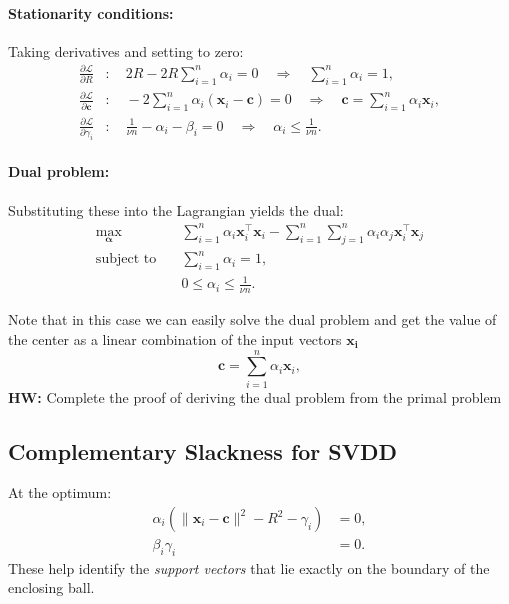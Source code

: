 \documentclass[11pt]{report}
\begin{document}
\paragraph{Stationarity conditions:}
Taking derivatives and setting to zero:
\begin{align}
\frac{\partial \mathcal{L}}{\partial R} & : \quad 2R - 2R \sum_{i=1}^n \alpha_i = 0 
\quad \Rightarrow \quad \sum_{i=1}^n \alpha_i = 1, \\
\frac{\partial \mathcal{L}}{\partial \mathbf{c}} & : \quad -2 \sum_{i=1}^n \alpha_i (\mathbf{x}_i - \mathbf{c}) = 0
\quad \Rightarrow \quad \mathbf{c} = \sum_{i=1}^n \alpha_i \mathbf{x}_i, \\
\frac{\partial \mathcal{L}}{\partial \gamma_i} & : \quad \frac{1}{\nu n} - \alpha_i - \beta_i = 0
\quad \Rightarrow \quad \alpha_i \leq \frac{1}{\nu n}.
\end{align}

\paragraph{Dual problem:}
Substituting these into the Lagrangian yields the dual:
\begin{align}
\max_{\boldsymbol{\alpha}} \quad & 
\sum_{i=1}^n \alpha_i \mathbf{x}_i^\top \mathbf{x}_i 
- \sum_{i=1}^n \sum_{j=1}^n \alpha_i \alpha_j \mathbf{x}_i^\top \mathbf{x}_j \\
\text{subject to} \quad & 
\sum_{i=1}^n \alpha_i = 1, \\
& 0 \leq \alpha_i \leq \frac{1}{\nu n}.
\end{align}

Note that in this case we can easily solve the dual problem and get the value of the center as a linear combination of the input vectors $\boldsymbol{x_i}$
\[\mathbf{c} = \sum_{i=1}^n \alpha_i \mathbf{x}_i,\]
\textbf{HW: }Complete the proof of deriving the dual problem from the primal problem

\subsection{Complementary Slackness for SVDD}
At the optimum:
\begin{align}
\alpha_i \left( \|\mathbf{x}_i - \mathbf{c} \|^2 - R^2 - \gamma_i \right) &= 0, \\
\beta_i \gamma_i &= 0.
\end{align}
These help identify the \emph{support vectors} that lie exactly on the boundary of the enclosing ball.
\end{document}
